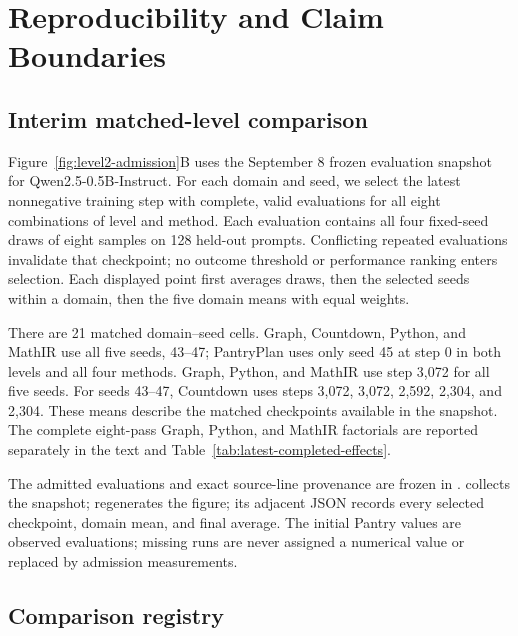 \documentclass{article}
\newcommand{\1}{\mathbf 1}
\theoremstyle{remark}
\theoremstyle{definition}
\theoremstyle{plain}
\begin{document}
\section{Reproducibility and Claim Boundaries}
\label{app:reproducibility}

\subsection{Interim matched-level comparison}
\label{app:level2-interim}

Figure~\ref{fig:level2-admission}B uses the September 8 frozen evaluation
snapshot for Qwen2.5-0.5B-Instruct. For each domain and seed, we select the
latest nonnegative training step with complete, valid evaluations for all
eight combinations of level and method. Each evaluation contains all four
fixed-seed draws of eight samples on 128 held-out prompts. Conflicting
repeated evaluations invalidate that checkpoint; no outcome threshold or
performance ranking enters selection. Each displayed point first averages
draws, then the selected seeds within a domain, then the five domain means
with equal weights.

There are 21 matched domain--seed cells. Graph, Countdown, Python, and MathIR
use all five seeds, 43--47; PantryPlan uses only seed 45 at step 0 in both
levels and all four methods. Graph, Python, and MathIR use step 3,072 for
all five seeds. For seeds 43--47, Countdown uses steps 3,072, 3,072, 2,592,
2,304, and 2,304. These means describe the matched checkpoints available in
the snapshot. The complete eight-pass Graph, Python, and MathIR factorials
are reported separately in the text and Table~\ref{tab:latest-completed-effects}.

The admitted evaluations and exact source-line provenance are frozen in
.
 collects the snapshot;
 regenerates the figure;
its adjacent JSON records every selected checkpoint, domain mean, and final
average. The initial Pantry values are observed evaluations; missing runs
are never assigned a numerical value or replaced by admission measurements.

\subsection{Comparison registry}
\label{app:program-registry}
\end{document}

